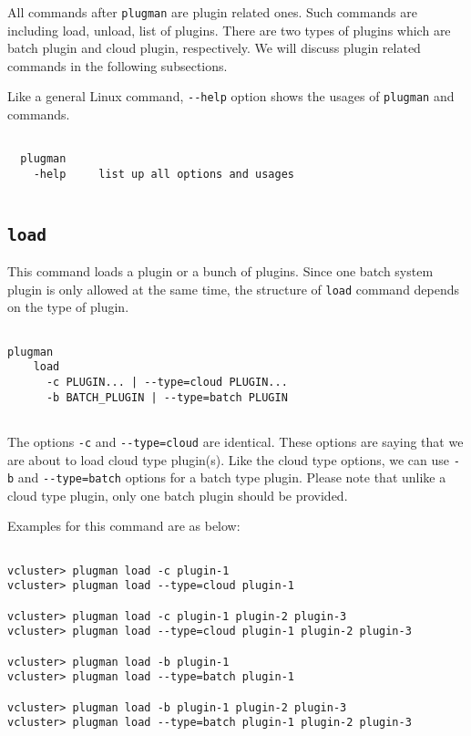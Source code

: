 \documentclass[11pt]{article}
\def \ttt{\texttt}
\def \vb{\verb}
\begin{document}
All commands after \vb+plugman+ are plugin related ones. Such commands are including load, unload, list of plugins. There are two types of plugins which are batch plugin and cloud plugin, respectively. We will discuss plugin related commands in the following subsections.

Like a general Linux command, \vb+--help+ option shows the usages of \vb+plugman+ and commands.

\begin{Verbatim}[fontfamily=courier, fontsize = \small, obeytabs
=true, tabsize=4, frame=lines]

  plugman 
    -help     list up all options and usages
  
\end{Verbatim}


\subsection{\ttt{load}}
This command loads a plugin or a bunch of plugins. Since one batch system plugin is only allowed at the same time, the structure of \vb+load+ command depends on the type of plugin.  

\begin{Verbatim}[fontfamily=courier, fontsize = \small, obeytabs
=true, tabsize=4, frame=lines]

plugman 
    load
      -c PLUGIN... | --type=cloud PLUGIN... 
      -b BATCH_PLUGIN | --type=batch PLUGIN
      
\end{Verbatim}


The options \vb+-c+ and \vb+--type=cloud+ are identical. These options are saying that we are about to load cloud type plugin(s). Like the cloud type options, we can use \vb+-b+ and \vb+--type=batch+ options for a batch type plugin. Please note that unlike a cloud type plugin, only one batch plugin should be provided.

Examples for this command are as below:


\begin{Verbatim}[fontfamily=courier, fontsize = \small, obeytabs
=true, tabsize=4, frame=lines]

vcluster> plugman load -c plugin-1
vcluster> plugman load --type=cloud plugin-1

vcluster> plugman load -c plugin-1 plugin-2 plugin-3
vcluster> plugman load --type=cloud plugin-1 plugin-2 plugin-3

vcluster> plugman load -b plugin-1
vcluster> plugman load --type=batch plugin-1

vcluster> plugman load -b plugin-1 plugin-2 plugin-3
vcluster> plugman load --type=batch plugin-1 plugin-2 plugin-3

\end{Verbatim}
\end{document}
